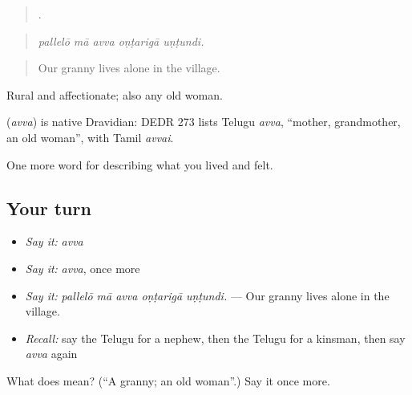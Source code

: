 \begin{quote}
    .
\end{quote}

\begin{quote}
\emph{pallelō mā avva oṇṭarigā uṇṭundi.}
\end{quote}

\begin{quote}
Our granny lives alone in the village.
\end{quote}

Rural and affectionate; also any old woman.

\begin{cousinweb}
\textbf{} (\emph{avva}) is native Dravidian: DEDR 273 lists Telugu \emph{avva}, \textquotedblleft{}mother, grandmother, an old woman\textquotedblright{}, with Tamil \emph{avvai}.
\end{cousinweb}

\begin{grammarlens}[title={What you've built}]
One more word for describing what you lived and felt.
\end{grammarlens}

\subsection*{Your turn}
\begin{itemize}
\raggedright
  \item \emph{Say it:} \emph{avva}
  \item \emph{Say it:} \emph{avva}, once more
  \item \emph{Say it:} \emph{pallelō mā avva oṇṭarigā uṇṭundi.} — Our granny lives alone in the village.
  \item \emph{Recall:} say the Telugu for a nephew, then the Telugu for a kinsman, then say \emph{avva} again
\end{itemize}

\begin{tcolorbox}[breakable,colback=teal!4,colframe=teal!35!black,title={Before you move on}]
What does  mean? (\textquotedblleft{}A granny; an old woman\textquotedblright{}.) Say it once more.
\end{tcolorbox}
